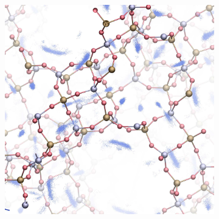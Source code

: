 \documentclass[main.tex]{subfiles}
\begin{document}
\begin{figure}
\begin{subfigure}{0.45\columnwidth}
		\includegraphics[width=\columnwidth]{figures/cations/FAU1_density.jpg}
		\label{fig:FAUdensity}
	\end{subfigure}\hfill
	
	\vspace{1em}
	

\end{figure}
\end{document}
